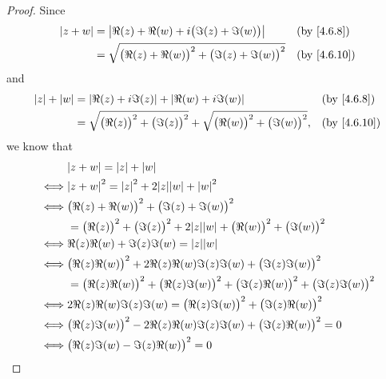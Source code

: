 \begin{proof}
  Since
  \begin{align*}
    \abs{z + w} & = \abs{\Re(z) + \Re(w) + i \big(\Im(z) + \Im(w)\big)}              &  & \by{4.6.8}                \\
                & = \sqrt{\big(\Re(z) + \Re(w)\big)^2 + \big(\Im(z) + \Im(w)\big)^2} &  & \text{(by \cref{4.6.10})}
  \end{align*}
  and
  \begin{align*}
    \abs{z} + \abs{w} & = \abs{\Re(z) + i \Im(z)} + \abs{\Re(w) + i \Im(w)}                                                &  & \by{4.6.8}                \\
                      & = \sqrt{\big(\Re(z)\big)^2 + \big(\Im(z)\big)^2} + \sqrt{\big(\Re(w)\big)^2 + \big(\Im(w)\big)^2}, &  & \text{(by \cref{4.6.10})}
  \end{align*}
  we know that
  \begin{align*}
         & \abs{z + w} = \abs{z} + \abs{w}                                                                                 \\
    \iff & \abs{z + w}^2 = \abs{z}^2 + 2 \abs{z} \abs{w} + \abs{w}^2                                                       \\
    \iff & \big(\Re(z) + \Re(w)\big)^2 + \big(\Im(z) + \Im(w)\big)^2                                                       \\
         & = \big(\Re(z)\big)^2 + \big(\Im(z)\big)^2 + 2 \abs{z} \abs{w} + \big(\Re(w)\big)^2 + \big(\Im(w)\big)^2         \\
    \iff & \Re(z) \Re(w) + \Im(z) \Im(w) = \abs{z} \abs{w}                                                                 \\
    \iff & \big(\Re(z) \Re(w)\big)^2 + 2 \Re(z) \Re(w) \Im(z) \Im(w) + \big(\Im(z) \Im(w)\big)^2                           \\
         & = \big(\Re(z) \Re(w)\big)^2 + \big(\Re(z) \Im(w)\big)^2 + \big(\Im(z) \Re(w)\big)^2 + \big(\Im(z) \Im(w)\big)^2 \\
    \iff & 2 \Re(z) \Re(w) \Im(z) \Im(w) = \big(\Re(z) \Im(w)\big)^2 + \big(\Im(z) \Re(w)\big)^2                           \\
    \iff & \big(\Re(z) \Im(w)\big)^2 - 2 \Re(z) \Re(w) \Im(z) \Im(w) + \big(\Im(z) \Re(w)\big)^2 = 0                       \\
    \iff & \big(\Re(z) \Im(w) - \Im(z) \Re(w)\big)^2 = 0                                                                   \\

\end{align*}
\end{proof}
